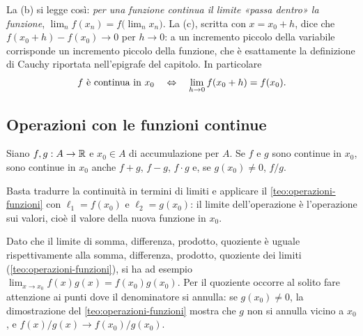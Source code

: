 La (b) si legge così: \emph{per una funzione continua il limite «passa dentro» la
funzione}, $\lim_{n}f(x_{n})=f\bigl(\lim_{n}x_{n}\bigr)$. La (c), scritta con
$x=x_{0}+h$, dice che $f(x_{0}+h)-f(x_{0})\to0$ per $h\to0$: a un incremento piccolo
della variabile corrisponde un incremento piccolo della funzione, che è esattamente la
definizione di Cauchy riportata nell'epigrafe del capitolo. In particolare
\begin{equation}\label{eq:continua-h}
  f \text{ è continua in } x_{0} \quad\Leftrightarrow\quad \lim_{h\to0}f(x_{0}+h)=f(x_{0}).
\end{equation}

\subsection{Operazioni con le funzioni continue}

\begin{teorema}\label{teo:operazioni-continue}
Siano $f,g:A\to\mathbb{R}$ e $x_{0}\in A$ di accumulazione per $A$. Se $f$ e $g$ sono continue
in $x_{0}$, sono continue in $x_{0}$ anche $f+g$, $f-g$, $f\cdot g$ e, se
$g(x_{0})\neq0$, $f/g$.
\end{teorema}

\begin{schema}
\end{schema}

\begin{strategia}
Basta tradurre la continuità in termini di limiti e applicare il
\cref{teo:operazioni-funzioni} con $\ell_{1}=f(x_{0})$ e $\ell_{2}=g(x_{0})$: il limite
dell'operazione è l'operazione sui valori, cioè il valore della nuova funzione in
$x_{0}$.
\end{strategia}

\begin{dimostrazione}
Dato che il limite di somma, differenza, prodotto, quoziente è uguale rispettivamente
alla somma, differenza, prodotto, quoziente dei limiti (\cref{teo:operazioni-funzioni}),
si ha ad esempio $\lim_{x\to x_{0}}f(x)g(x)=f(x_{0})g(x_{0})$. Per il quoziente
occorre al solito fare attenzione ai punti dove il denominatore si annulla: se
$g(x_{0})\neq0$, la dimostrazione del \cref{teo:operazioni-funzioni} mostra che $g$ non
si annulla vicino a $x_{0}$, e $f(x)/g(x)\to f(x_{0})/g(x_{0})$.
\end{dimostrazione}

